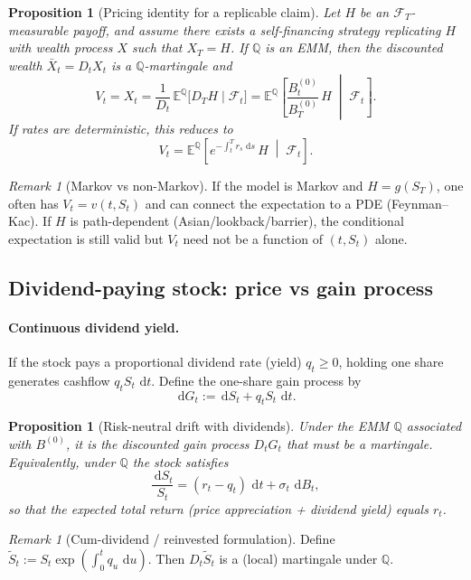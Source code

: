 \documentclass[11pt]{article}
\newcommand{\F}{\mathcal{F}}
\newcommand{\Qbb}{\mathbb{Q}}
\newcommand{\E}{\mathbb{E}}
\newcommand{\dd}{\,\mathrm{d}}
\newcommand{\1}{\mathbf{1}}
\theoremstyle{plain}
\newtheorem{proposition}[theorem]{Proposition}
\theoremstyle{definition}
\theoremstyle{remark}
\newtheorem{remark}[theorem]{Remark}
\begin{document}
\begin{proposition}[Pricing identity for a replicable claim]
Let $H$ be an $\F_T$-measurable payoff, and assume there exists a self-financing strategy
replicating $H$ with wealth process $X$ such that $X_T=H$.
If $\Qbb$ is an EMM, then the discounted wealth $\bar X_t=D_t X_t$ is a $\Qbb$-martingale and
\[
\boxed{
\;
V_t=X_t
=
\frac{1}{D_t}\,\E^{\Qbb}\!\big[D_T H\mid \F_t\big]
=
\E^{\Qbb}\!\left[\frac{B_t^{(0)}}{B_T^{(0)}}\,H\;\middle|\;\F_t\right].
\;}
\]
If rates are deterministic, this reduces to
\[
\boxed{
\;
V_t=\E^{\Qbb}\!\left[e^{-\int_t^T r_s\,\dd s}\,H\;\middle|\;\F_t\right].
\;}
\]
\end{proposition}

\begin{remark}[Markov vs non-Markov]
If the model is Markov and $H=g(S_T)$, one often has $V_t=v(t,S_t)$ and can connect the expectation to a PDE (Feynman--Kac).
If $H$ is path-dependent (Asian/lookback/barrier), the conditional expectation is still valid but $V_t$ need not be a function of $(t,S_t)$ alone.
\end{remark}

\subsection{Dividend-paying stock: price vs gain process}

\paragraph{Continuous dividend yield.}
If the stock pays a proportional dividend rate (yield) $q_t\ge 0$, holding one share generates cashflow $q_t S_t\,\dd t$.
Define the one-share gain process by
\[
\dd G_t := \dd S_t + q_t S_t\,\dd t.
\]

\begin{proposition}[Risk-neutral drift with dividends]
Under the EMM $\Qbb$ associated with $B^{(0)}$, it is the discounted gain process $D_t G_t$ that must be a martingale.
Equivalently, under $\Qbb$ the stock satisfies
\[
\boxed{\ \frac{\dd S_t}{S_t}=(r_t-q_t)\,\dd t+\sigma_t\,\dd B_t,\ }
\]
so that the expected total return (price appreciation + dividend yield) equals $r_t$.
\end{proposition}

\begin{remark}[Cum-dividend / reinvested formulation]
Define $\widetilde S_t:=S_t\exp(\int_0^t q_u\,\dd u)$. Then $D_t\widetilde S_t$ is a (local) martingale under $\Qbb$.
\end{remark}
\end{document}
